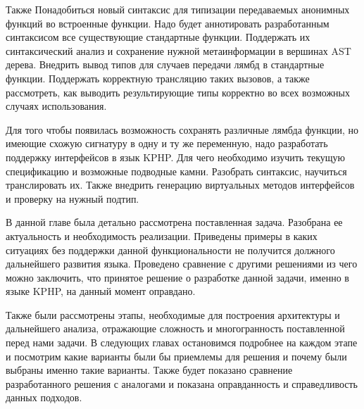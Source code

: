 Также Понадобиться новый синтаксис для типизации передаваемых анонимных функций во встроенные функции.
Надо будет аннотировать разработанным синтаксисом все существующие стандартные функции.
Поддержать их синтаксический анализ и сохранение нужной метаинформации в вершинах AST дерева.
Внедрить вывод типов для случаев передачи лямбд в стандартные функции.
Поддержать корректную трансляцию таких вызовов, а также рассмотреть, как выводить результирующие типы корректно во всех возможных случаях использования.

Для того чтобы появилась возможность сохранять различные лямбда функции, но имеющие схожую сигнатуру в одну и ту же переменную, надо разработать поддержку интерфейсов в язык KPHP.
Для чего необходимо изучить текущую спецификацию и возможные подводные камни.
Разобрать синтаксис, научиться транслировать их.
Также внедрить генерацию виртуальных методов интерфейсов и проверку на нужный подтип.

\chapterconclusion
В данной главе была детально рассмотрена поставленная задача.
Разобрана ее актуальность и необходимость реализации.
Приведены примеры в каких ситуациях без поддержки данной функциональности не получится должного дальнейшего развития языка.
Проведено сравнение с другими решениями из чего можно заключить, что принятое решение о разработке данной задачи, именно в языке KPHP, на данный момент оправдано.

Также были рассмотрены этапы, необходимые для построения архитектуры и дальнейшего анализа, отражающие сложность и многогранность поставленной перед нами задачи.
В следующих главах остановимся подробнее на каждом этапе и посмотрим какие варианты были бы приемлемы для решения и почему были выбраны именно такие варианты.
Также будет показано сравнение разработанного решения с аналогами и показана оправданность и справедливость данных подходов.

